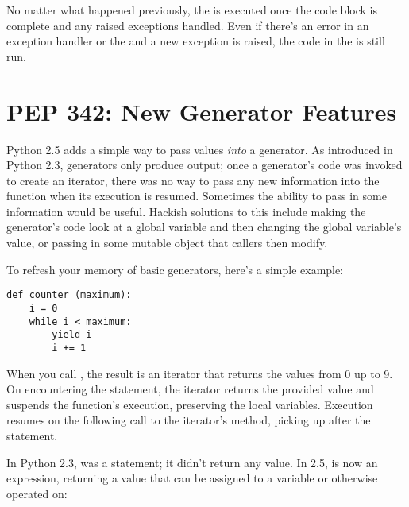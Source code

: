 \documentclass{howto}
\begin{document}
No matter what happened previously, the  is executed
once the code block is complete and any raised exceptions handled.
Even if there's an error in an exception handler or the
 and a new exception is raised, the
code in the  is still run.

\begin{seealso}


\end{seealso}


\section{PEP 342: New Generator Features\label{pep-342}}

Python 2.5 adds a simple way to pass values \emph{into} a generator.
As introduced in Python 2.3, generators only produce output; once a
generator's code was invoked to create an iterator, there was no way to
pass any new information into the function when its execution is
resumed.  Sometimes the ability to pass in some information would be
useful.  Hackish solutions to this include making the generator's code
look at a global variable and then changing the global variable's
value, or passing in some mutable object that callers then modify.

To refresh your memory of basic generators, here's a simple example:

\begin{verbatim}
def counter (maximum):
    i = 0
    while i < maximum:
        yield i
        i += 1
\end{verbatim}

When you call , the result is an iterator that
returns the values from 0 up to 9.  On encountering the
 statement, the iterator returns the provided value and
suspends the function's execution, preserving the local variables.
Execution resumes on the following call to the iterator's 
 method, picking up after the  statement.

In Python 2.3,  was a statement; it didn't return any
value.  In 2.5,  is now an expression, returning a
value that can be assigned to a variable or otherwise operated on:
\end{document}
